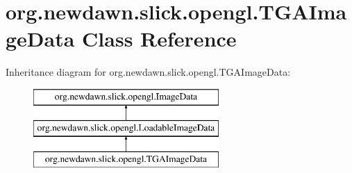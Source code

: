 \hypertarget{classorg_1_1newdawn_1_1slick_1_1opengl_1_1_t_g_a_image_data}{}\section{org.\+newdawn.\+slick.\+opengl.\+T\+G\+A\+Image\+Data Class Reference}
\label{classorg_1_1newdawn_1_1slick_1_1opengl_1_1_t_g_a_image_data}
Inheritance diagram for org.\+newdawn.\+slick.\+opengl.\+T\+G\+A\+Image\+Data\+:\begin{figure}[H]
\begin{center}
\leavevmode
\includegraphics[height=3.000000cm]{classorg_1_1newdawn_1_1slick_1_1opengl_1_1_t_g_a_image_data}
\end{center}
\end{figure}
